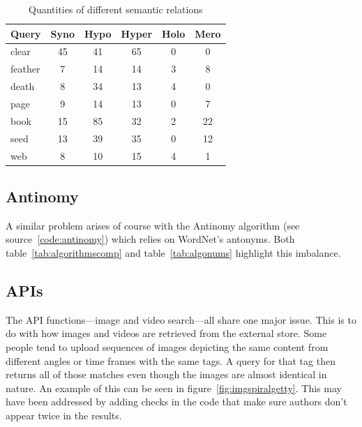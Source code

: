 \begin{table}[!htbp]
\centering
\caption[Quantities of different semantic relations]{Quantities of different semantic relations}
\label{tab:semnum}
\begin{tabu}{lccccc}
\toprule
\textbf{Query} & \textbf{Syno} & \textbf{Hypo} & \textbf{Hyper} & \textbf{Holo} & \textbf{Mero} \\ \midrule
clear   & 45   & 41   & 65    & 0    & 0    \\
feather & 7    & 14   & 14    & 3    & 8    \\
death   & 8    & 34   & 13    & 4    & 0    \\
page    & 9    & 14   & 13    & 0    & 7    \\
book    & 15   & 85   & 32    & 2    & 22   \\
seed    & 13   & 39   & 35    & 0    & 12   \\
web     & 8    & 10   & 15    & 4    & 1    \\ \bottomrule
\end{tabu}
\end{table}


\subsection{Antinomy}

A similar problem arises of course with the Antinomy algorithm (see source~\ref{code:antinomy}) which relies on WordNet's antonyms. Both table~\ref{tab:algorithmscomp} and table~\ref{tab:algonums} highlight this imbalance.


\subsection{APIs}
\label{s:apis}

The \ac{API} functions---image and video search---all share one major issue. This is to do with how images and videos are retrieved from the external store. Some people tend to upload sequences of images depicting the same content from different angles or time frames with the same tags. A query for that tag then returns all of those matches even though the images are almost identical in nature. An example of this can be seen in figure~\ref{fig:imgspiralgetty}. This may have been addressed by adding checks in the code that make sure authors don't appear twice in the results.

